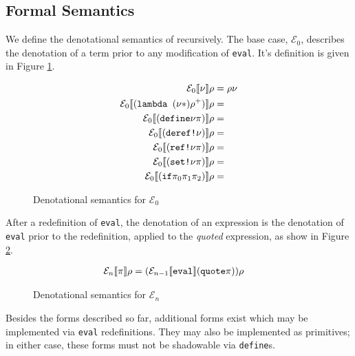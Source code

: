 \subsection{Formal Semantics} We define the denotational semantics of \rad
recursively. The base case, $\mathcal{E}_{0}$, describes the denotation of a
term prior to any modification of \texttt{eval}. It's definition is given in
Figure \ref{f:denotationalsem0}.


\begin{figure}[H]
\begin{align*}
  \mathcal{E}_{0} \llbracket \nu \rrbracket \rho &= \rho \nu  \\
  \mathcal{E}_{0} \llbracket (\text{\texttt{lambda }} (\nu *) \rho^{+}) \rrbracket \rho &=   \\
  \mathcal{E}_{0} \llbracket (\text{\texttt{define}} \nu \pi ) \rrbracket \rho &=   \\
  \mathcal{E}_{0} \llbracket (\text{\texttt{deref!}} \nu  ) \rrbracket \rho &=   \\
  \mathcal{E}_{0} \llbracket (\text{\texttt{ref!}} \nu \pi) \rrbracket \rho &=   \\
  \mathcal{E}_{0} \llbracket (\text{\texttt{set!}} \nu \pi) \rrbracket \rho &=   \\
  \mathcal{E}_{0} \llbracket (\text{\texttt{if}} \pi_0 \pi_1 \pi_2) \rrbracket \rho &=  
\end{align*}
\caption{Denotational semantics for $\mathcal{E}_{0}$}
\label{f:denotationalsem0}
\end{figure}

After a redefinition of \texttt{eval}, the denotation of an expression is the
denotation of \texttt{eval} prior to the redefinition, applied to the
\textit{quoted} expression, as show in Figure \ref{f:denotationalsemn}.

\begin{figure}[H]
\begin{align*}
  \mathcal{E}_{n} \llbracket \pi \rrbracket \rho &= (\mathcal{E}_{n-1} \llbracket \text{\texttt{eval}} \rrbracket  (\text{\texttt{quote}} \pi))\rho 
\end{align*}
\caption{Denotational semantics for $\mathcal{E}_{n}$}
\label{f:denotationalsemn}
\end{figure}

Besides the forms described so far, additional forms exist which may be
implemented via \texttt{eval} redefinitions. They may also be implemented as
primitives; in either case, these forms must not be shadowable via
\texttt{define}s.
